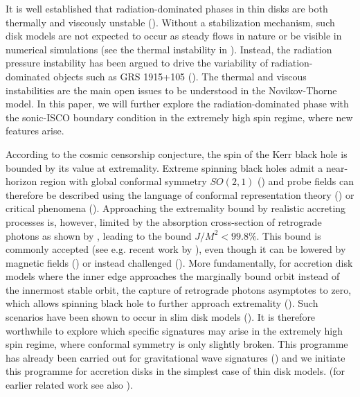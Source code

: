 \documentclass[a4paper,fleqn,usenatbib]{mnrasMOD}
\numberwithin{equation}{section}
\begin{document}
It is well established that radiation-dominated phases in thin disks are both thermally and viscously unstable (\cite{1974ApJ...187L...1L,1976MNRAS.175..613S}). Without a stabilization mechanism, such disk models are not expected to occur as steady flows in nature or be visible in numerical simulations (see the thermal instability in \cite{Mishra:2016yyp}). Instead, the radiation pressure instability has been argued to drive the variability of radiation-dominated objects such as GRS 1915+105 (\cite{1538-4357-542-1-L33}). The thermal and viscous instabilities are the main open issues to be understood in the Novikov-Thorne model. In this paper, we will further explore the radiation-dominated phase with the sonic-ISCO boundary condition in the extremely high spin regime, where new features arise. 

According to the cosmic censorship conjecture, the spin of the Kerr black hole is bounded by its value at extremality.  Extreme spinning black holes admit a near-horizon region with global conformal symmetry $SO(2,1)$ (\cite{Bardeen:1999px}) and probe fields can therefore be described using the language of conformal representation theory (\cite{Porfyriadis:2014fja,Lupsasca:2014pfa,Zhang:2014pla,Lupsasca:2014hua,Li:2014bta,Compere:2015pja}) or critical phenomena (\cite{Gralla:2016jfc}). Approaching the extremality bound by realistic accreting processes is, however, limited by the absorption cross-section of retrograde photons as shown by \cite{1974ApJ...191..507T}, leading to the bound $J/M^2 <99.8\%$. This bound is commonly accepted (see e.g. recent work by \cite{Kesden:2009ds}), even though it can be lowered by magnetic fields (\cite{Gammie:2003qi}) %
or instead challenged (\cite{2011A&A...532A..41S}). More fundamentally, for accretion disk models where the inner edge  approaches the marginally bound orbit instead of the innermost stable orbit, the capture of retrograde photons asymptotes to zero, which allows spinning black hole to further approach extremality (\cite{1980AcA....30...35A}). Such scenarios have been shown to occur in slim disk models (\cite{2011A&A...532A..41S}). It is therefore worthwhile to explore which specific signatures may arise in the extremely high spin regime, where conformal symmetry is only slightly broken. This programme has already been carried out for gravitational wave signatures (\cite{Hadar:2014dpa,Hadar:2015xpa,Gralla:2016qfw}) and we initiate this programme for accretion disks in the simplest case of thin disk models. (for earlier related work see also \cite{2009arXiv0909.2041G}). 
\end{document}
